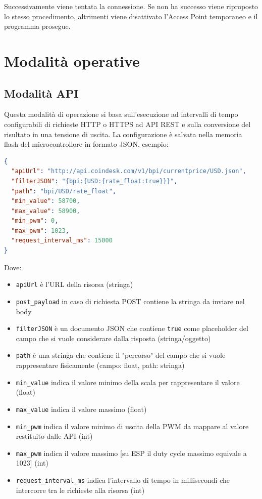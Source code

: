 \documentclass[12pt,a4paper]{report}
\begin{document}

Successivamente viene tentata la connessione. Se non ha successo viene riproposto lo stesso procedimento, altrimenti viene disattivato
l'Access Point temporaneo e il programma prosegue.

\pagebreak
\section{Modalità operative}

\subsection{Modalità API}
Questa modalità di operazione si basa sull'esecuzione ad intervalli di tempo configurabili di richieste HTTP o HTTPS ad API REST
e sulla conversione del risultato in una tensione di uscita.
La configurazione è salvata nella memoria flash del microcontrollore
in formato JSON, esempio:

\begin{lstlisting}[language=json,firstnumber=1]
{
  "apiUrl": "http://api.coindesk.com/v1/bpi/currentprice/USD.json",
  "filterJSON": "{bpi:{USD:{rate_float:true}}}",
  "path": "bpi/USD/rate_float",
  "min_value": 58700,
  "max_value": 58900,
  "min_pwm": 0,
  "max_pwm": 1023,
  "request_interval_ms": 15000
}
\end{lstlisting}


\noindent Dove:
\begin{itemize}
  \item \texttt{apiUrl} è l'URL della risorsa (stringa)
  \item \texttt{post_payload} in caso di richiesta POST contiene la stringa da inviare nel body
  \item \texttt{filterJSON} è un documento JSON che contiene \texttt{true} come placeholder del campo che si vuole considerare dalla risposta (stringa/oggetto)
  \item \texttt{path} è una stringa che contiene il "percorso" del campo che si vuole rappresentare fisicamente (campo: float, path: stringa)
  \item \texttt{min_value} indica il valore minimo della scala per rappresentare il valore (float)
  \item \texttt{max_value} indica il valore massimo (float)
  \item \texttt{min_pwm} indica il valore minimo di uscita della PWM da mappare al valore restituito dalle API (int)
  \item \texttt{max_pwm} indica il valore massimo [su ESP il duty cycle massimo equivale a 1023] (int)
  \item \texttt{request_interval_ms} indica l'intervallo di tempo in millisecondi che intercorre tra le richieste alla risorsa (int)
\end{itemize}
\end{document}

